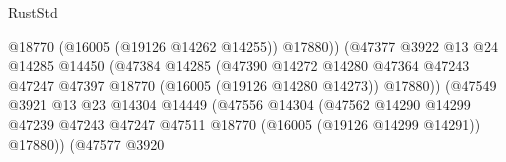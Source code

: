 \begin{lexlean}{RustStd}
\begin{coremodule}
                                                      @18770
                                                      (@16005 (@19126 @14262 @14255))
                                                      @17880))
                                                  (@47377
                                                    @3922
                                                    @13
                                                    @24
                                                    @14285
                                                    @14450
                                                    (@47384
                                                      @14285
                                                      (@47390
                                                        @14272
                                                        @14280
                                                        @47364
                                                        @47243
                                                        @47247
                                                        @47397
                                                        @18770
                                                        (@16005 (@19126 @14280 @14273))
                                                        @17880))
                                                    (@47549
                                                      @3921
                                                      @13
                                                      @23
                                                      @14304
                                                      @14449
                                                      (@47556
                                                        @14304
                                                        (@47562
                                                          @14290
                                                          @14299
                                                          @47239
                                                          @47243
                                                          @47247
                                                          @47511
                                                          @18770
                                                          (@16005 (@19126 @14299 @14291))
                                                          @17880))
                                                      (@47577
                                                        @3920

\end{coremodule}
\end{lexlean}
